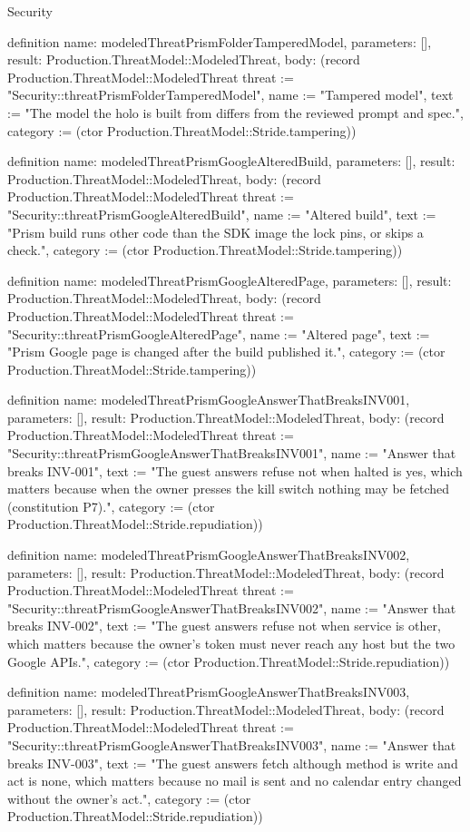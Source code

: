 \begin{lexlean}{Security}
\begin{semanticmodule}
definition{
  name: modeledThreatPrismFolderTamperedModel,
  parameters: [],
  result: Production.ThreatModel::ModeledThreat,
  body: (record Production.ThreatModel::ModeledThreat {threat := "Security::threatPrismFolderTamperedModel", name := "Tampered model", text := "The model the holo is built from differs from the reviewed prompt and spec.", category := (ctor Production.ThreatModel::Stride.tampering)})
}

definition{
  name: modeledThreatPrismGoogleAlteredBuild,
  parameters: [],
  result: Production.ThreatModel::ModeledThreat,
  body: (record Production.ThreatModel::ModeledThreat {threat := "Security::threatPrismGoogleAlteredBuild", name := "Altered build", text := "Prism build runs other code than the SDK image the lock pins, or skips a check.", category := (ctor Production.ThreatModel::Stride.tampering)})
}

definition{
  name: modeledThreatPrismGoogleAlteredPage,
  parameters: [],
  result: Production.ThreatModel::ModeledThreat,
  body: (record Production.ThreatModel::ModeledThreat {threat := "Security::threatPrismGoogleAlteredPage", name := "Altered page", text := "Prism Google page is changed after the build published it.", category := (ctor Production.ThreatModel::Stride.tampering)})
}

definition{
  name: modeledThreatPrismGoogleAnswerThatBreaksINV001,
  parameters: [],
  result: Production.ThreatModel::ModeledThreat,
  body: (record Production.ThreatModel::ModeledThreat {threat := "Security::threatPrismGoogleAnswerThatBreaksINV001", name := "Answer that breaks INV-001", text := "The guest answers refuse not when halted is yes, which matters because when the owner presses the kill switch nothing may be fetched (constitution P7).", category := (ctor Production.ThreatModel::Stride.repudiation)})
}

definition{
  name: modeledThreatPrismGoogleAnswerThatBreaksINV002,
  parameters: [],
  result: Production.ThreatModel::ModeledThreat,
  body: (record Production.ThreatModel::ModeledThreat {threat := "Security::threatPrismGoogleAnswerThatBreaksINV002", name := "Answer that breaks INV-002", text := "The guest answers refuse not when service is other, which matters because the owner's token must never reach any host but the two Google APIs.", category := (ctor Production.ThreatModel::Stride.repudiation)})
}

definition{
  name: modeledThreatPrismGoogleAnswerThatBreaksINV003,
  parameters: [],
  result: Production.ThreatModel::ModeledThreat,
  body: (record Production.ThreatModel::ModeledThreat {threat := "Security::threatPrismGoogleAnswerThatBreaksINV003", name := "Answer that breaks INV-003", text := "The guest answers fetch although method is write and act is none, which matters because no mail is sent and no calendar entry changed without the owner's act.", category := (ctor Production.ThreatModel::Stride.repudiation)})
}


\end{semanticmodule}
\end{lexlean}
